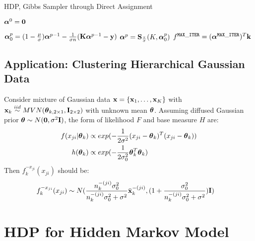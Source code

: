\documentclass{article} %
\begin{document}
\begin{algorithm}[H]
\caption{HDP, Gibbs Sampler through Direct Assignment}
\label{alg:MKL}
\begin{algorithmic}[1]
\State $\boldsymbol{\alpha}^0={\bf 0}$

\State 
$\boldsymbol{\alpha}_0^{p} = (1-\frac{\mu}{\sigma})\boldsymbol{\alpha}^{p-1} - \frac{1}{\sigma n}({\bf K}\boldsymbol{\alpha}^{p-1} - {\bf y}) $
\State 
$\boldsymbol{\alpha}^p = {\bf S}_{\frac{\tau}{\sigma}}(K, \boldsymbol{\alpha}_0^{p})$
\EndFor
\State \Return $f^{\tt MAX\_ITER} = (\boldsymbol{\alpha}^{\tt MAX\_ITER})^T{\bf k}$
\EndProcedure
\end{algorithmic}
\end{algorithm}

\subsection{Application: Clustering Hierarchical Gaussian Data}
Consider mixture of Gaussian data ${\bf x} = \{ {\bf x}_1, \dots, {\bf x}_K \}$ with ${\bf x}_k \stackrel{iid}{\sim} MVN(\boldsymbol{\theta}_{k, 2 \times 1}, {\bf I}_{2 \times 2})$ with unknown mean $\boldsymbol{\theta}$. Assuming diffused Gaussian prior $\boldsymbol{\theta} \sim N({\bf 0}, \sigma^2 {\bf I})$, the form of likelihood $F$ and base measure $H$ are:
\begin{align*}
f(x_{ji} | \boldsymbol{\theta}_k ) 
&\propto 
exp(-\frac{1}{2 \sigma^2} (x_{ji} - \boldsymbol{\theta}_k)^T(x_{ji} - \boldsymbol{\theta}_k))
\\
h(\boldsymbol{\theta}_k) 
&\propto 
exp(-\frac{1}{2\sigma_0^2}\boldsymbol{\theta}_k^T\boldsymbol{\theta}_k)
\end{align*}
Then $f_k^{-x_{ji}}(x_{ji})$ should be:
\begin{align*}
f_k^{-x_{ji}}(x_{ji}) & \sim 
N( \frac{n_{k}^{-(ji)}\sigma_0^2}{ n_{k}^{-(ji)}\sigma_0^2 + \sigma^2} 
\bar{{\bf x}}_k^{-(ji)}, 
(1 + \frac{\sigma_0^2}{n_{k}^{-(ji)} \sigma_0^2 + \sigma^2} ) {\bf I})
\end{align*}


\newpage
\section{HDP for Hidden Markov Model}
\end{document}
